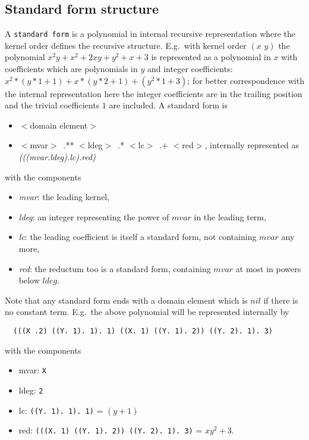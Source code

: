 \subsection{Standard form structure}

A {\tt standard form} is a polynomial in internal recursive
representation where the kernel order defines the recursive
structure. E.g.\  with kernel order $(x\,\,y)$ the polynomial 
$x^2y +x^2 + 2xy + y^2 + x + 3$ is represented as a polynomial
in $x$ with coefficients which are polynomials in $y$ and integer coefficients:
$x^2*(y*1+1) + x*(y*2+1) +(y^2*1 +3)$; for better correspondence
with the internal representation here the integer coefficients
are in the trailing position and the trivial coefficients $1$ are 
included.
A standard form is 

\begin{itemize}
\item $<$domain element$>$  
\item $<$mvar$>$\ .** $<$ldeg$>$\ .* $<$lc$>$\ .+ $<$red$>$, 
    internally represented as {\em (((mvar.ldeg).lc).red)} 
\end{itemize}
with the components
\begin{itemize}
\item {\em mvar}: the leading kernel,
\item {\em ldeg}: an integer representing the power of $mvar$ in the leading
 term,
\item{\em lc}: the leading coefficient is itself a standard form,
 not containing $mvar$ any more,
\item{\em red}: the reductum too is a standard form, containing $mvar$
  at most in powers below $ldeg$.
\end{itemize}
Note that any standard form ends with a domain element which 
is  $nil$ if there is no constant term.
 E.g.\  the above polynomial
will be represented internally by

\begin{verbatim}
  (((X .2) ((Y. 1). 1). 1) ((X. 1) ((Y. 1). 2)) ((Y. 2). 1). 3)
\end{verbatim}

with the components
\begin{itemize}
\item{mvar}: \verb+X+
\item{ldeg}: \verb+2+
\item{lc}: \verb+((Y. 1). 1). 1)+  = $(y+1)$
\item{red}: \verb+(((X. 1) ((Y. 1). 2)) ((Y. 2). 1). 3)+ = $xy^2+3$.
\end{itemize}


